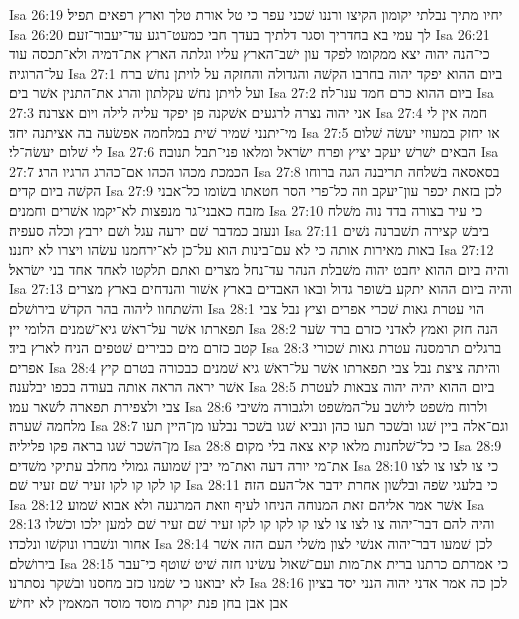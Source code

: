 Isa 26:19  יחיו מתיך נבלתי יקומון הקיצו ורננו שׁכני עפר כי טל אורת טלך וארץ רפאים תפיל׃
Isa 26:20  לך עמי בא בחדריך וסגר דלתיך בעדך חבי כמעט־רגע עד־יעבור־זעם׃
Isa 26:21  כי־הנה יהוה יצא ממקומו לפקד עון ישׁב־הארץ עליו וגלתה הארץ את־דמיה ולא־תכסה עוד על־הרוגיה׃
Isa 27:1  ביום ההוא יפקד יהוה בחרבו הקשׁה והגדולה והחזקה על לויתן נחשׁ ברח ועל לויתן נחשׁ עקלתון והרג את־התנין אשׁר בים׃
Isa 27:2  ביום ההוא כרם חמד ענו־לה׃
Isa 27:3  אני יהוה נצרה לרגעים אשׁקנה פן יפקד עליה לילה ויום אצרנה׃
Isa 27:4  חמה אין לי מי־יתנני שׁמיר שׁית במלחמה אפשׂעה בה אציתנה יחד׃
Isa 27:5  או יחזק במעוזי יעשׂה שׁלום לי שׁלום יעשׂה־לי׃
Isa 27:6  הבאים ישׁרשׁ יעקב יציץ ופרח ישׂראל ומלאו פני־תבל תנובה׃
Isa 27:7  הכמכת מכהו הכהו אם־כהרג הרגיו הרג׃
Isa 27:8  בסאסאה בשׁלחה תריבנה הגה ברוחו הקשׁה ביום קדים׃
Isa 27:9  לכן בזאת יכפר עון־יעקב וזה כל־פרי הסר חטאתו בשׂומו כל־אבני מזבח כאבני־גר מנפצות לא־יקמו אשׁרים וחמנים׃
Isa 27:10  כי עיר בצורה בדד נוה משׁלח ונעזב כמדבר שׁם ירעה עגל ושׁם ירבץ וכלה סעפיה׃
Isa 27:11  ביבשׁ קצירה תשׁברנה נשׁים באות מאירות אותה כי לא עם־בינות הוא על־כן לא־ירחמנו עשׂהו ויצרו לא יחננו׃
Isa 27:12  והיה ביום ההוא יחבט יהוה משׁבלת הנהר עד־נחל מצרים ואתם תלקטו לאחד אחד בני ישׂראל׃
Isa 27:13  והיה ביום ההוא יתקע בשׁופר גדול ובאו האבדים בארץ אשׁור והנדחים בארץ מצרים והשׁתחוו ליהוה בהר הקדשׁ בירושׁלם׃
Isa 28:1  הוי עטרת גאות שׁכרי אפרים וציץ נבל צבי תפארתו אשׁר על־ראשׁ גיא־שׁמנים הלומי יין׃
Isa 28:2  הנה חזק ואמץ לאדני כזרם ברד שׂער קטב כזרם מים כבירים שׁטפים הניח לארץ ביד׃
Isa 28:3  ברגלים תרמסנה עטרת גאות שׁכורי אפרים׃
Isa 28:4  והיתה ציצת נבל צבי תפארתו אשׁר על־ראשׁ גיא שׁמנים כבכורה בטרם קיץ אשׁר יראה הראה אותה בעודה בכפו יבלענה׃
Isa 28:5  ביום ההוא יהיה יהוה צבאות לעטרת צבי ולצפירת תפארה לשׁאר עמו׃
Isa 28:6  ולרוח משׁפט ליושׁב על־המשׁפט ולגבורה משׁיבי מלחמה שׁערה׃
Isa 28:7  וגם־אלה ביין שׁגו ובשׁכר תעו כהן ונביא שׁגו בשׁכר נבלעו מן־היין תעו מן־השׁכר שׁגו בראה פקו פליליה׃
Isa 28:8  כי כל־שׁלחנות מלאו קיא צאה בלי מקום׃
Isa 28:9  את־מי יורה דעה ואת־מי יבין שׁמועה גמולי מחלב עתיקי משׁדים׃
Isa 28:10  כי צו לצו צו לצו קו לקו קו לקו זעיר שׁם זעיר שׁם׃
Isa 28:11  כי בלעגי שׂפה ובלשׁון אחרת ידבר אל־העם הזה׃
Isa 28:12  אשׁר אמר אליהם זאת המנוחה הניחו לעיף וזאת המרגעה ולא אבוא שׁמוע׃
Isa 28:13  והיה להם דבר־יהוה צו לצו צו לצו קו לקו קו לקו זעיר שׁם זעיר שׁם למען ילכו וכשׁלו אחור ונשׁברו ונוקשׁו ונלכדו׃
Isa 28:14  לכן שׁמעו דבר־יהוה אנשׁי לצון משׁלי העם הזה אשׁר בירושׁלם׃
Isa 28:15  כי אמרתם כרתנו ברית את־מות ועם־שׁאול עשׂינו חזה שׁיט שׁוטף כי־עבר לא יבואנו כי שׂמנו כזב מחסנו ובשׁקר נסתרנו׃
Isa 28:16  לכן כה אמר אדני יהוה הנני יסד בציון אבן אבן בחן פנת יקרת מוסד מוסד המאמין לא יחישׁ׃
